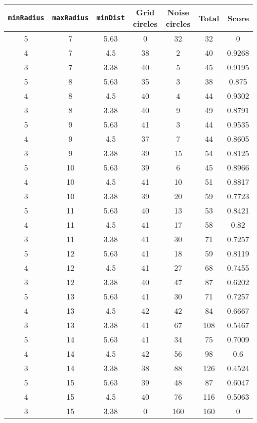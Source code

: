 \documentclass[letterpaper, 12pt]{article}
\begin{document}
\begin{longtable}{|c|c|c|c|c|c|c|}
\hline
\textbf{\texttt{minRadius}} & \textbf{\texttt{maxRadius}} & \textbf{\texttt{minDist}} & \textbf{Grid circles} & \textbf{Noise circles} & \textbf{Total} & \textbf{Score} \\
\hline
5 & 7 & 5.63 & 0 & 32 & 32 & 0 \\
\hline
4 & 7 & 4.5 & 38 & 2 & 40 & 0.9268 \\
\hline
3 & 7 & 3.38 & 40 & 5 & 45 & 0.9195 \\
\hline
5 & 8 & 5.63 & 35 & 3 & 38 & 0.875 \\
\hline
4 & 8 & 4.5 & 40 & 4 & 44 & 0.9302 \\
\hline
3 & 8 & 3.38 & 40 & 9 & 49 & 0.8791 \\
\hline
5 & 9 & 5.63 & 41 & 3 & 44 & 0.9535 \\
\hline
4 & 9 & 4.5 & 37 & 7 & 44 & 0.8605 \\
\hline
3 & 9 & 3.38 & 39 & 15 & 54 & 0.8125 \\
\hline
5 & 10 & 5.63 & 39 & 6 & 45 & 0.8966 \\
\hline
4 & 10 & 4.5 & 41 & 10 & 51 & 0.8817 \\
\hline
3 & 10 & 3.38 & 39 & 20 & 59 & 0.7723 \\
\hline
5 & 11 & 5.63 & 40 & 13 & 53 & 0.8421 \\
\hline
4 & 11 & 4.5 & 41 & 17 & 58 & 0.82 \\
\hline
3 & 11 & 3.38 & 41 & 30 & 71 & 0.7257 \\
\hline
5 & 12 & 5.63 & 41 & 18 & 59 & 0.8119 \\
\hline
4 & 12 & 4.5 & 41 & 27 & 68 & 0.7455 \\
\hline
3 & 12 & 3.38 & 40 & 47 & 87 & 0.6202 \\
\hline
5 & 13 & 5.63 & 41 & 30 & 71 & 0.7257 \\
\hline
4 & 13 & 4.5 & 42 & 42 & 84 & 0.6667 \\
\hline
3 & 13 & 3.38 & 41 & 67 & 108 & 0.5467 \\
\hline
5 & 14 & 5.63 & 41 & 34 & 75 & 0.7009 \\
\hline
4 & 14 & 4.5 & 42 & 56 & 98 & 0.6 \\
\hline
3 & 14 & 3.38 & 38 & 88 & 126 & 0.4524 \\
\hline
5 & 15 & 5.63 & 39 & 48 & 87 & 0.6047 \\
\hline
4 & 15 & 4.5 & 40 & 76 & 116 & 0.5063 \\
\hline
3 & 15 & 3.38 & 0 & 160 & 160 & 0 \\

\end{longtable}
\end{document}
